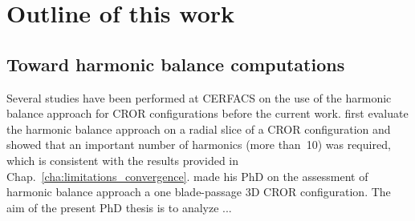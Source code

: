 \section*{Outline of this work}
\label{sec:outline_of_this_work}

\subsection*{Toward harmonic balance computations}
\label{sub:toward_harmonic_balance_computations}

Several studies have been performed at CERFACS on the use
of the harmonic balance approach for CROR configurations 
before the current work.
\citet{Yabili2010} first evaluate the harmonic balance approach
on a radial slice of a CROR configuration and showed that an
important number of harmonics (more than~10) was required,
which is consistent with the results provided in 
Chap.~\ref{cha:limitations_convergence}.
\citet{ThesisFrancois} made his PhD on the assessment of
harmonic balance approach a one blade-passage 3D CROR configuration.
The aim of the present PhD thesis is to analyze ...



